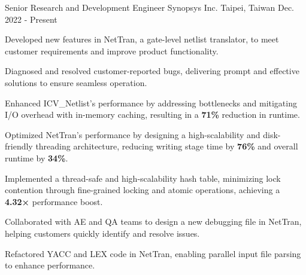

\begin{cventries}

  \cventry
    {Senior Research and Development Engineer} %
    {Synopsys Inc.} %
    {Taipei, Taiwan} %
    {Dec. 2022 - Present} %
    {
      \begin{cvitems} %
        \item {Developed new features in NetTran, a gate-level netlist translator, to meet customer requirements and improve product functionality.}
        \item {Diagnosed and resolved customer-reported bugs, delivering prompt and effective solutions to ensure seamless operation.}
        \item {Enhanced ICV\_Netlist’s performance by addressing bottlenecks and mitigating I/O overhead with in-memory caching, resulting in a \textbf{71\%} reduction in runtime.}
        \item {Optimized NetTran’s performance by designing a high-scalability and disk-friendly threading architecture, reducing writing stage time by \textbf{76\%} and overall runtime by \textbf{34\%}.}
        \item {Implemented a thread-safe and high-scalability hash table, minimizing lock contention through fine-grained locking and atomic operations, achieving a \textbf{4.32×} performance boost.}
        \item {Collaborated with AE and QA teams to design a new debugging file in NetTran, helping customers quickly identify and resolve issues.}
        \item {Refactored YACC and LEX code in NetTran, enabling parallel input file parsing to enhance performance.}
      \end{cvitems}
    }

\end{cventries}
